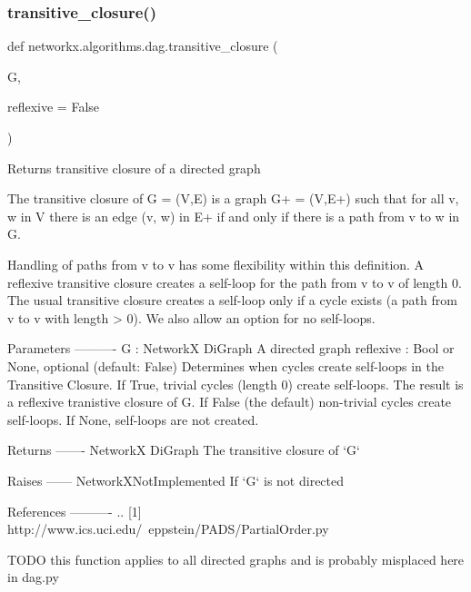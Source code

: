 \subsubsection{\texorpdfstring{transitive\+\_\+closure()}{transitive\_closure()}}
{\footnotesize\ttfamily def networkx.\+algorithms.\+dag.\+transitive\+\_\+closure (\begin{DoxyParamCaption}\item[{}]{G,  }\item[{}]{reflexive = {\ttfamily False} }\end{DoxyParamCaption})}

\begin{DoxyVerb}Returns transitive closure of a directed graph

The transitive closure of G = (V,E) is a graph G+ = (V,E+) such that
for all v, w in V there is an edge (v, w) in E+ if and only if there
is a path from v to w in G.

Handling of paths from v to v has some flexibility within this definition.
A reflexive transitive closure creates a self-loop for the path
from v to v of length 0. The usual transitive closure creates a
self-loop only if a cycle exists (a path from v to v with length > 0).
We also allow an option for no self-loops.

Parameters
----------
G : NetworkX DiGraph
    A directed graph
reflexive : Bool or None, optional (default: False)
    Determines when cycles create self-loops in the Transitive Closure.
    If True, trivial cycles (length 0) create self-loops. The result
    is a reflexive tranistive closure of G.
    If False (the default) non-trivial cycles create self-loops.
    If None, self-loops are not created.

Returns
-------
NetworkX DiGraph
    The transitive closure of `G`

Raises
------
NetworkXNotImplemented
    If `G` is not directed

References
----------
.. [1] http://www.ics.uci.edu/~eppstein/PADS/PartialOrder.py

TODO this function applies to all directed graphs and is probably misplaced
     here in dag.py
\end{DoxyVerb}
 \mbox{\label{namespacenetworkx_1_1algorithms_1_1dag_a461cd43df92c1a7dcb7e5605d750801f}} 
